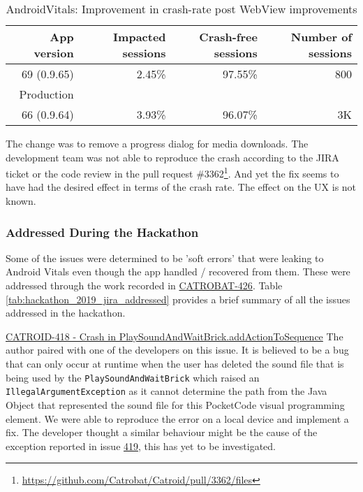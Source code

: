 \begin{table}[htbp!]
    \centering
    \footnotesize
    \begin{tabular}{r|r|r|r}
        App version &Impacted sessions &Crash-free sessions &Number of sessions  \\
        \hline
        69 (0.9.65) &2.45\% &	97.55\% 	&~800 \\
        Production &&& \\
        \hline
        66 (0.9.64) &3.93\% &96.07\% 	&~3K
    \end{tabular}
    \caption{AndroidVitals: Improvement in crash-rate post WebView improvements}
    \label{tab:androidvitals_rollout_of_0_9_65}
\end{table}

The change was to remove a progress dialog for media downloads. The development team was not able to reproduce the crash according to the JIRA ticket or the code review in the pull request \#3362\footnote{\url{https://github.com/Catrobat/Catroid/pull/3362/files}}. And yet the fix seems to have had the desired effect in terms of the crash rate. The effect on the UX is not known.

\subsubsection{Addressed During the Hackathon}
Some of the issues were determined to be 'soft errors' that were leaking to Android Vitals even though the app handled / recovered from them. These were addressed through the work recorded in  \href{https://jira.catrob.at/browse/CATROID-426}{CATROBAT-426}. Table \ref{tab:hackathon_2019_jira_addressed} provides a brief summary of all the issues addressed in the hackathon.


\href{https://jira.catrob.at/browse/CATROID-418}{CATROID-418 - Crash in PlaySoundAndWaitBrick.addActionToSequence} The author paired with one of the developers on this issue. It is believed to be a bug that can only occur at runtime when the user has deleted the sound file that is being used by the \texttt{PlaySoundAndWaitBrick} which raised an \texttt{IllegalArgumentException} as it cannot determine the path from the Java Object that represented the sound file for this PocketCode visual programming element. We were able to reproduce the error on a local device and implement a fix. The developer thought a similar behaviour might be the cause of the exception reported in issue \href{https://jira.catrob.at/browse/CATROID-419}{419}, this has yet to be investigated.

